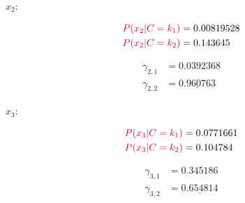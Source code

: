 \documentclass[12pt]{article}
\begin{document}
\begin{enumerate}[leftmargin=\labelsep]
\begin{enumerate}[leftmargin=\labelsep]
\begin{paracol}{3}
                  \switchcolumn

                  $x_2$:

                  \begin{normalsize}
                    \begin{equation*}
                      \begin{aligned}
                        \textcolor{purple}{P(x_2 | C = k_1)} & = 0.00819528 \\
                        \textcolor{purple}{P(x_2 | C = k_2)} & = 0.143645
                      \end{aligned}
                    \end{equation*}

                    \begin{equation*}
                      \begin{aligned}
                        \gamma_{2, 1} & = 0.0392368            \\
                        \gamma_{2, 2} & = \underline{0.960763}
                      \end{aligned}
                    \end{equation*}
                  \end{normalsize}

                  \switchcolumn

                  $x_3$:

                  \begin{normalsize}
                    \begin{equation*}
                      \begin{aligned}
                        \textcolor{purple}{P(x_3 | C = k_1)} & = 0.0771661 \\
                        \textcolor{purple}{P(x_3 | C = k_2)} & = 0.104784
                      \end{aligned}
                    \end{equation*}

                    \begin{equation*}
                      \begin{aligned}
                        \gamma_{3, 1} & = 0.345186             \\
                        \gamma_{3, 2} & = \underline{0.654814}
                      \end{aligned}
                    \end{equation*}
                  \end{normalsize}


\end{paracol}
\end{enumerate}
\end{enumerate}
\end{document}
